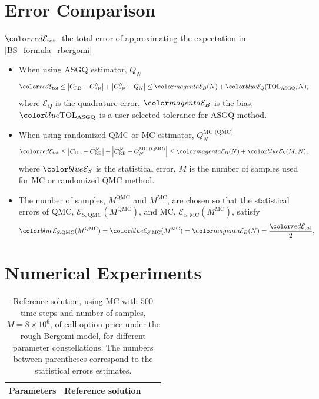 \documentclass[ima, 20pt, portrait, plainboxedsections]{sciposter}
\begin{document}
\begin{multicols}{3}
\section*{Error Comparison}
$\red{\mathcal{E}_{\text{tot}}}$: the total error of approximating the  expectation in \eqref{BS_formula_rbergomi} 
\begin{itemize}
	\item When using ASGQ estimator, $Q_N$
	\begin{align}\label{eq:total_error_ASGQ}
	\red{\mathcal{E}_{\text{tot}}} & \le \abs{C_{\text{RB}}-C_{\text{RB}}^N}+\abs{C_{\text{RB}}^N-Q_{N}} \le \green{\mathcal{E}_B(N)}+ \blue{\mathcal{E}_Q(\text{TOL}_{\text{ASGQ}},N)},
	\end{align}
where  $\mathcal{E}_Q$ is the quadrature error, $\green{\mathcal{E}_B}$  is the bias, $\blue{\text{TOL}_{\text{ASGQ}}}$ is a user selected tolerance for ASGQ method.
\item When using randomized QMC or MC estimator,   $Q^{\text{MC (QMC)}}_N$
		\begin{align}\label{eq:total_error_MC}
	\red{\mathcal{E}_{\text{tot}}} & \le \abs{C_{\text{RB}}-C_{\text{RB}}^N}+\abs{C_{\text{RB}}^N-Q^{\text{MC (QMC)}}_N} \le \green{\mathcal{E}_B(N)}+ \blue{\mathcal{E}_{S}(M,N)},
	\end{align}
	where  $\blue{\mathcal{E}_S}$ is the statistical error, $M$ is the number of samples used for MC or randomized QMC method.
	\item The number of samples, $M^{\text{QMC}}$ and $M^{\text{MC}}$, are chosen so that  the statistical errors of QMC, $\mathcal{E}_{S,\text{QMC}}(M^{\text{QMC}})$, and MC, $\mathcal{E}_{S,\text{MC}}(M^{\text{MC}})$, satisfy
	\begin{align}\label{optimal_number_samples}
	\blue{\mathcal{E}_{S,\text{QMC}}(M^{\text{QMC}})}=\blue{\mathcal{E}_{S,\text{MC}}(M^{\text{MC}})}= \green{\mathcal{E}_B(N)}=\frac{\red{\mathcal{E}_{\text{tot}}}}{2}\COMMA
	\end{align}
\end{itemize}


\section*{Numerical Experiments}
\begin{table}[!h]
\begin{small}
	\centering
\caption{Reference solution, using MC with $500$ time steps and number of samples, $M=8 \times 10^6$, of call option price under the rough Bergomi model, for different parameter constellations.  The numbers between parentheses correspond to the statistical errors estimates.}
\label{table:Reference solution, using MC with $500$ time steps, of Call option price under rBergomi model, for different parameter constellation.}
	\begin{tabular}{l*{2}{c}r}
	\toprule[1.5pt]
		\textbf{Parameters}            & \textbf{Reference solution}    \\
	\hline
		

\end{tabular}
\end{small}
\end{table}
\end{multicols}
\end{document}
